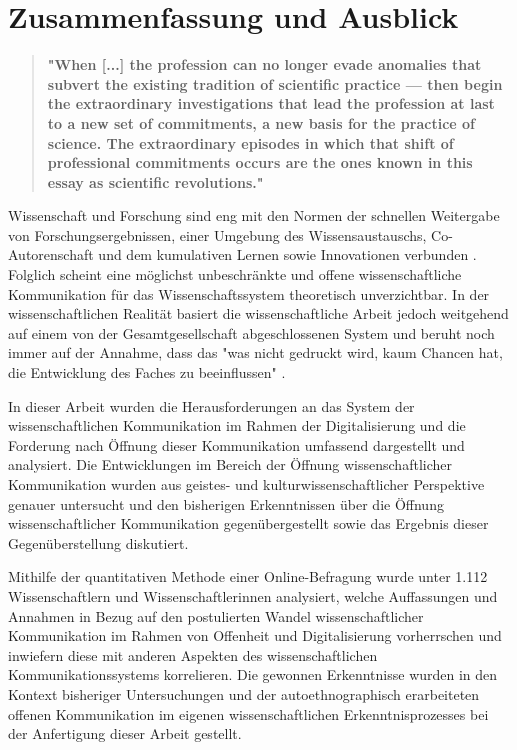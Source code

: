 \chapter{Zusammenfassung und Ausblick}

\begin{quote}
\textbf{"When [...] the profession can no longer evade anomalies that subvert the existing tradition of scientific practice — then begin the extraordinary investigations that lead the profession at last to a new set of commitments, a new basis for the practice of science. The extraordinary episodes in which that shift of professional commitments occurs are the ones known in this essay as scientific revolutions."}
\end{quote} \cite[:6]{Kuhn_2012}

Wissenschaft und Forschung sind eng mit den Normen der schnellen Weitergabe von Forschungsergebnissen, einer Umgebung des Wissensaustauschs, Co-Autorenschaft und dem kumulativen Lernen sowie Innovationen verbunden \cite{Partha_1994}. Folglich scheint eine möglichst unbeschränkte und offene wissenschaftliche Kommunikation für das Wissenschaftssystem theoretisch unverzichtbar. In der wissenschaftlichen Realität basiert die wissenschaftliche Arbeit jedoch weitgehend auf einem von der Gesamtgesellschaft abgeschlossenen System und beruht noch immer auf der Annahme, dass das "was nicht gedruckt wird, kaum Chancen hat, die Entwicklung des Faches zu beeinflussen" \cite{Luhmann_1997}.

In dieser Arbeit wurden die Herausforderungen an das System der wissenschaftlichen Kommunikation im Rahmen der Digitalisierung und die Forderung nach Öffnung dieser Kommunikation umfassend dargestellt und analysiert. Die Entwicklungen im Bereich der Öffnung wissenschaftlicher Kommunikation wurden aus geistes- und kulturwissenschaftlicher Perspektive genauer untersucht und den bisherigen Erkenntnissen über die Öffnung wissenschaftlicher Kommunikation gegenübergestellt sowie das Ergebnis dieser Gegenüberstellung diskutiert.

Mithilfe der quantitativen Methode einer Online-Befragung wurde unter 1.112 Wissenschaftlern und Wissenschaftlerinnen analysiert, welche Auffassungen und Annahmen in Bezug auf den postulierten Wandel wissenschaftlicher Kommunikation im Rahmen von Offenheit und Digitalisierung vorherrschen und inwiefern diese mit anderen Aspekten des wissenschaftlichen Kommunikationssystems korrelieren. Die gewonnen Erkenntnisse wurden in den Kontext bisheriger Untersuchungen und der autoethnographisch erarbeiteten offenen Kommunikation im eigenen wissenschaftlichen Erkenntnisprozesses bei der Anfertigung dieser Arbeit gestellt.

